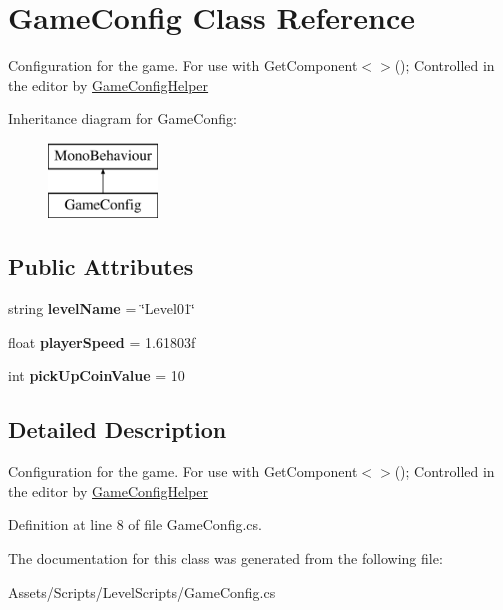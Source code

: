\hypertarget{class_game_config}{\section{Game\+Config Class Reference}
\label{class_game_config}
}


Configuration for the game. For use with Get\+Component$<$$>$(); Controlled in the editor by \hyperlink{class_game_config_helper}{Game\+Config\+Helper}  


Inheritance diagram for Game\+Config\+:\begin{figure}[H]
\begin{center}
\leavevmode
\includegraphics[height=2.000000cm]{class_game_config}
\end{center}
\end{figure}
\subsection*{Public Attributes}
\begin{DoxyCompactItemize}
\item 
\hypertarget{class_game_config_a7ff8b994fa969ec37d290f5417e9f668}{string {\bfseries level\+Name} = \char`\"{}Level01\char`\"{}}\label{class_game_config_a7ff8b994fa969ec37d290f5417e9f668}

\item 
\hypertarget{class_game_config_a57453d5451afd7d19e541567385a5e24}{float {\bfseries player\+Speed} = 1.\+61803f}\label{class_game_config_a57453d5451afd7d19e541567385a5e24}

\item 
\hypertarget{class_game_config_ac61c80bdbd45f3fc7dc1a0e71bb993be}{int {\bfseries pick\+Up\+Coin\+Value} = 10}\label{class_game_config_ac61c80bdbd45f3fc7dc1a0e71bb993be}

\end{DoxyCompactItemize}


\subsection{Detailed Description}
Configuration for the game. For use with Get\+Component$<$$>$(); Controlled in the editor by \hyperlink{class_game_config_helper}{Game\+Config\+Helper} 



Definition at line 8 of file Game\+Config.\+cs.



The documentation for this class was generated from the following file\+:\begin{DoxyCompactItemize}
\item 
Assets/\+Scripts/\+Level\+Scripts/Game\+Config.\+cs\end{DoxyCompactItemize}
